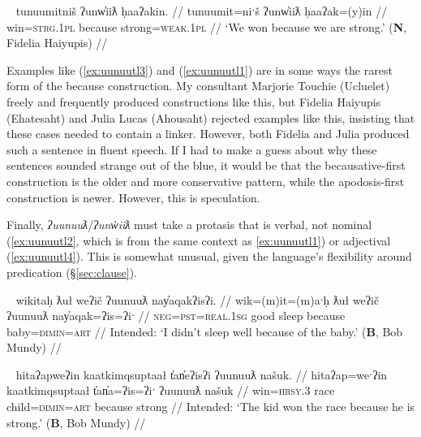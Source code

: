 \ex~ \label{ex:unwiitl1}
\begingl
\glpreamble tunuumitniš ʔunw̓iiƛ ḥaaʔakin. //
\gla tunuumit=niˑš ʔunw̓iiƛ ḥaaʔak=(y)in //
\glb win=\textsc{strg.1pl} because strong=\textsc{weak.1pl} //
\glft `We won because we are strong.' (\textbf{N}, Fidelia Haiyupis) //
\endgl
\xe

Examples like (\ref{ex:uunuutl3}) and (\ref{ex:uunuutl1}) are in some ways the rarest form of the because construction. My consultant Marjorie Touchie (Ucluelet) freely and frequently produced constructions like this, but Fidelia Haiyupis (Ehatesaht) and Julia Lucas (Ahousaht) rejected examples like this, insisting that these cases needed to contain a linker. However, both Fidelia and Julia produced such a sentence in fluent speech. If I had to make a guess about why these sentences sounded strange out of the blue, it would be that the becausative-first construction is the older and more conservative pattern, while the apodosis-first construction is newer. However, this is speculation.

Finally, \textit{ʔuunuuƛ}/\textit{ʔunw̓iiƛ} must take a protasis that is verbal, not nominal (\ref{ex:uunuutl2}, which is from the same context as \ref{ex:uunuutl1}) or adjectival (\ref{ex:uunuutl4}). This is somewhat unusual, given the language's flexibility around predication (\S\ref{sec:clause}).

\ex~ \label{ex:uunuutl2}
\begingl
\glpreamble *wikitaḥ ƛuł weʔič ʔuunuuƛ nay̓aqakʔisʔi. //
\gla wik=(m)it=(m)aˑḥ ƛuł weʔič ʔuunuuƛ nay̓aqak=ʔis=ʔiˑ //
\glb \textsc{neg}=\textsc{pst}=\textsc{real.1sg} good sleep because baby=\textsc{dimin}=\textsc{art} //
\glft Intended: `I didn't sleep well because of the baby.' (\textbf{B}, Bob Mundy) //
\endgl
\xe


\ex~ \label{ex:uunuutl4}
\begingl
\glpreamble *hitaʔapweʔin kaatkimqsuptaał t̓an̓eʔisʔi ʔuunuuƛ našuk. //
\gla hitaʔap=weˑʔin kaatkimqsuptaał t̓an̓a=ʔis=ʔiˑ ʔuunuuƛ našuk //
\glb win=\textsc{hrsy.3} race child=\textsc{dimin}=\textsc{art} because strong //
\glft Intended: `The kid won the race because he is strong.' (\textbf{B}, Bob Mundy) //
\endgl
\xe

\vspace{5pt}


\begin{comment}
Becausitives also follow the typical verbal pattern of being able to freely drop arguments, already seen in (\ref{ex:uunuutl1}) and again in (\ref{ex:becausechanged}).

\vspace{5pt}

Context for (\ref{ex:becausechanged}): A retelling of traditional ways of life. This followed an explanation of how this isn't done anymore, and a lengthy pause.

\ex~ \label{ex:becausechanged}
\begingl
\glpreamble ʔunʔuuƛ̓aƛʔał kʷiisḥin. //
\gla ʔunʔuuƛ=!aƛ=ʔał kʷis-L.ḥin //
\glb because=\textsc{now}=\textsc{pl} different-\textsc{dr} //
\glft `Because they're different now.' (\textbf{C}, \textit{tupaat} Julia Lucas) //
\endgl
\xe
\end{comment}

